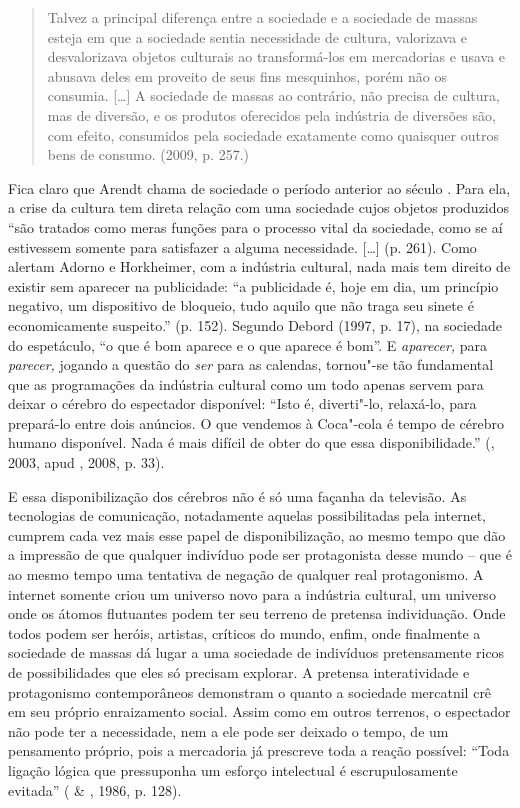 \begin{quote}
Talvez a principal diferença entre a sociedade e a sociedade de massas
esteja em que a sociedade sentia necessidade de cultura, valorizava e
desvalorizava objetos culturais ao transformá-los em mercadorias e usava
e abusava deles em proveito de seus fins mesquinhos, porém não os
consumia. [\ldots{}] A sociedade de massas ao contrário, não precisa
de cultura, mas de diversão, e os produtos oferecidos pela indústria de
diversões são, com efeito, consumidos pela sociedade exatamente como
quaisquer outros bens de consumo. (2009, p. 257.)
\end{quote}

Fica claro que Arendt chama de sociedade o período anterior ao século
. Para ela, a crise da cultura tem direta relação com uma sociedade
cujos objetos produzidos ``são tratados como meras funções para o
processo vital da sociedade, como se aí estivessem somente para
satisfazer a alguma necessidade. [\ldots{}] (p. 261). Como alertam
Adorno e Horkheimer, com a indústria cultural, nada mais tem
direito de existir sem aparecer na publicidade: ``a publicidade é, hoje
em dia, um princípio negativo, um dispositivo de bloqueio, tudo aquilo
que não traga seu sinete é economicamente suspeito.'' (p. 152). Segundo
Debord (1997, p. 17), na sociedade do espetáculo, ``o que é bom aparece
e o que aparece é bom''. E \emph{aparecer,} para \emph{parecer,}
jogando a questão do \emph{ser} para as calendas, tornou"-se tão
fundamental que as programações da indústria cultural como um todo
apenas servem para deixar o cérebro do espectador disponível: ``Isto é,
diverti"-lo, relaxá-lo, para prepará-lo entre dois anúncios. O que
vendemos à Coca"-cola é tempo de cérebro humano disponível. Nada é mais
difícil de obter do que essa disponibilidade.'' (, 2003, apud
, 2008, p. 33).

E essa disponibilização dos cérebros não é só uma façanha da televisão.
As tecnologias de comunicação, notadamente aquelas possibilitadas pela
internet, cumprem cada vez mais esse papel de disponibilização, ao mesmo
tempo que dão a impressão de que qualquer indivíduo pode ser
protagonista desse mundo -- que é ao mesmo tempo uma tentativa de
negação de qualquer real protagonismo. A internet somente criou um
universo novo para a indústria cultural, um universo onde os átomos
flutuantes podem ter seu terreno de pretensa individuação. Onde todos
podem ser heróis, artistas, críticos do mundo, enfim, onde finalmente a
sociedade de massas dá lugar a uma sociedade de indivíduos pretensamente
ricos de possibilidades que eles só precisam explorar. A pretensa
interatividade e protagonismo contemporâneos demonstram o quanto a
sociedade mercatnil crê em seu próprio enraizamento social. Assim como
em outros terrenos, o espectador não pode ter a necessidade, nem a ele
pode ser deixado o tempo, de um pensamento próprio, pois a mercadoria já
prescreve toda a reação possível: ``Toda ligação lógica que pressuponha
um esforço intelectual é escrupulosamente evitada'' ( \&
, 1986, p. 128).

